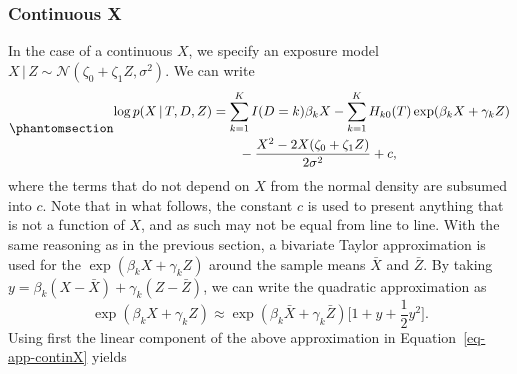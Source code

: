 \documentclass[
  letterpaper,
  DIV=11,
  numbers=noendperiod]{scrreprt}
\newcommand{\given}{\,|\,}
\begin{document}
\subsubsection*{Continuous X}\label{continuous-x-1}

In the case of a continuous \(X\), we specify an exposure model
\(X \given Z \sim \mathcal{N}(\zeta_0 + \zeta_1 Z, \sigma^2)\). We can
write \begin{equation}\phantomsection\label{eq-app-continX}{
\begin{aligned}
    \log p(X \given T, D, Z) &= \sum^K_{k = 1} I(D=k) \beta_k X - \sum^K_{k = 1} H_{k0}(T)\exp(\beta_k X + \gamma_k Z) \\
    &\qquad - \frac{X^2 - 2X ( \zeta_0 + \zeta_1 Z)}{2\sigma^2} + c, 
\end{aligned}
}\end{equation} where the terms that do not depend on \(X\) from the
normal density are subsumed into \(c\). Note that in what follows, the
constant \(c\) is used to present anything that is not a function of
\(X\), and as such may not be equal from line to line. With the same
reasoning as in the previous section, a bivariate Taylor approximation
is used for the \(\exp(\beta_k X + \gamma_k Z)\) around the sample means
\(\bar{X}\) and \(\bar{Z}\). By taking
\(y = \beta_k(X - \bar{X}) + \gamma_k(Z - \bar{Z})\), we can write the
quadratic approximation as \begin{equation*}
    \exp(\beta_k X + \gamma_k Z) \approx \exp(\beta_k \bar{X} + \gamma_k \bar{Z})\bigg[ 1 + y + \frac{1}{2}y^2 \bigg].
\end{equation*} Using first the linear component of the above
approximation in Equation~\ref{eq-app-continX} yields
\end{document}
